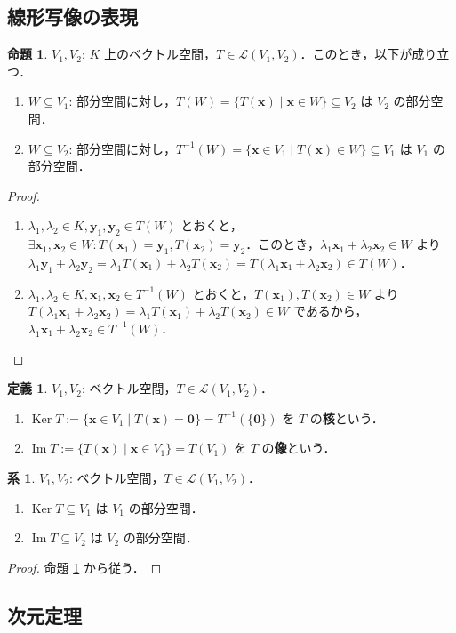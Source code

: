 \documentclass{jlreq}
\theoremstyle{definition}
\newtheorem{dfn}[thm]{定義}
\newtheorem{prop}[thm]{命題}
\newtheorem{cor}[thm]{系}
\DeclareMathOperator{\Ker}{Ker}
\DeclareMathOperator{\Img}{Im}
\begin{document}
    \subsection{線形写像の表現}
      \begin{prop}\label{image-and-preimage-of-subspace-is-subspace}
        $V_1, V_2$: $K$ 上のベクトル空間，$T \in \mathcal{L}(V_1,V_2)$．このとき，以下が成り立つ．
        \begin{enumerate}
          \item $W \subseteq V_1$: 部分空間に対し，$T(W)=\{T(\bm{x}) \mid \bm{x} \in W\} \subseteq V_2$ は $V_2$ の部分空間．
          \item $W \subseteq V_2$: 部分空間に対し，$T^{-1}(W)=\{\bm{x} \in V_1 \mid T(\bm{x}) \in W\} \subseteq V_1$ は $V_1$ の部分空間．
        \end{enumerate}
      \end{prop}
      \begin{proof}
        \mbox{}
        \begin{enumerate}
          \item $\lambda_1,\lambda_2 \in K, \bm{y}_1,\bm{y}_2 \in T(W)$ とおくと，$\exists \bm{x}_1,\bm{x}_2 \in W: T(\bm{x}_1)=\bm{y}_1,T(\bm{x}_2)=\bm{y}_2$．このとき，$\lambda_1\bm{x}_1+\lambda_2\bm{x}_2 \in W$ より $\lambda_1\bm{y}_1+\lambda_2\bm{y}_2=\lambda_1T(\bm{x}_1)+\lambda_2T(\bm{x}_2)=T(\lambda_1\bm{x}_1+\lambda_2\bm{x}_2) \in T(W)$．
          \item $\lambda_1,\lambda_2 \in K, \bm{x}_1,\bm{x}_2 \in T^{-1}(W)$ とおくと，$T(\bm{x}_1),T(\bm{x}_2) \in W$ より $T(\lambda_1\bm{x}_1+\lambda_2\bm{x}_2)=\lambda_1T(\bm{x}_1)+\lambda_2T(\bm{x}_2) \in W$ であるから，$\lambda_1\bm{x}_1+\lambda_2\bm{x}_2 \in T^{-1}(W)$．
        \end{enumerate}
      \end{proof}
      \begin{dfn}
        $V_1, V_2$: ベクトル空間，$T \in \mathcal{L}(V_1,V_2)$．
        \begin{enumerate}
          \item $\Ker T := \{\bm{x} \in V_1 \mid T(\bm{x})=\bm{0}\} = T^{-1}(\{\bm{0}\})$ を $T$ の\textbf{核}という．
          \item $\Img T := \{T(\bm{x}) \mid \bm{x} \in V_1\} = T(V_1)$ を $T$ の\textbf{像}という．
        \end{enumerate}
      \end{dfn}
      \begin{cor}
        $V_1,V_2$: ベクトル空間，$T \in \mathcal{L}(V_1,V_2)$．
        \begin{enumerate}
          \item $\Ker T \subseteq V_1$ は $V_1$ の部分空間．
          \item $\Img T \subseteq V_2$ は $V_2$ の部分空間．
        \end{enumerate}
      \end{cor}
      \begin{proof}
        命題 \ref{image-and-preimage-of-subspace-is-subspace} から従う．
      \end{proof}
    \subsection{次元定理}
      
\end{document}
